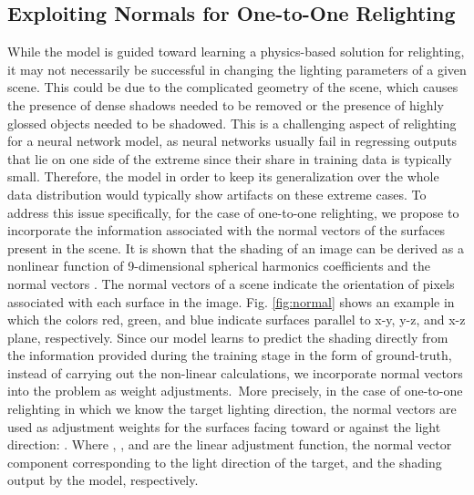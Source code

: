 \documentclass[final]{cvpr}
\begin{document}
\subsection{Exploiting Normals for One-to-One Relighting}
While the model is guided toward learning a physics-based solution for relighting, it may not necessarily be successful in changing the lighting parameters of a given scene. This could be due to the complicated geometry of the scene, which causes the presence of dense shadows needed to be removed or the presence of highly glossed objects needed to be shadowed. This is a challenging aspect of relighting for a neural network model, as neural networks usually fail in regressing outputs that lie on one side of the extreme since their share in training data is typically small. Therefore, the model in order to keep its generalization over the whole data distribution would typically show artifacts on these extreme cases. To address this issue specifically, for the case of one-to-one relighting, we propose to incorporate the information associated with the normal vectors of the surfaces present in the scene. It is shown that the shading of an image can be derived as a nonlinear function of 9-dimensional spherical harmonics coefficients and the normal vectors \cite{7,8,24,26}. The normal vectors of a scene indicate the orientation of pixels associated with each surface in the image. Fig. \ref{fig:normal} shows an example in which the colors red, green, and blue indicate surfaces parallel to x-y, y-z, and x-z plane, respectively. Since our model learns to predict the shading directly from the information provided during the training stage in the form of ground-truth, instead of carrying out the non-linear calculations, we incorporate normal vectors into the problem as weight adjustments.\ More precisely, in the case of one-to-one relighting in which we know the target lighting direction, the normal vectors are used as adjustment weights for the surfaces facing toward or against the light direction: .
Where , , and  are the linear adjustment function, the normal vector component corresponding to the light direction of the target, and the shading output by the model, respectively.
\end{document}
